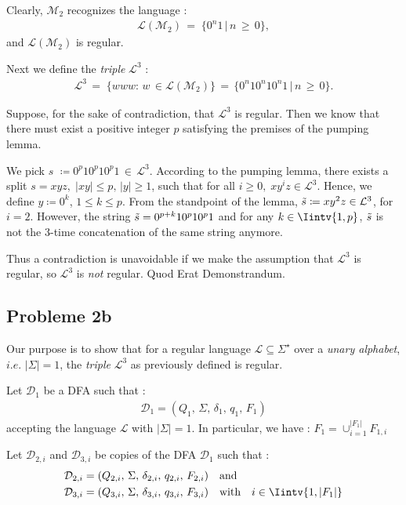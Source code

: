 \documentclass{article}
\begin{document}
Clearly, $\mathcal{M}_2$ recognizes the language :
\begin{align*}
    \mathcal{L}(\mathcal{M}_2)\,=\; \{0^n1\,|\, n\,\geq\, 0\},
\end{align*}
and $\mathcal{L}(\mathcal{M}_2)$ is regular.

Next we define the \textit{triple} $\mathcal{L}^3$ :
\begin{align*}
    \mathcal{L}^3\,=\;\{www :\,w\,\in\mathcal{L}(\mathcal{M}_2)\}\,=\,\{0^n10^n10^n1\,|\, n\,\geq\, 0\}.
\end{align*}

Suppose, for the sake of contradiction, that $\mathcal{L}^3$ is regular. Then we know that there must exist a positive integer $p$ satisfying the premises of the pumping lemma.

We pick $s$ $\coloneqq 0^p10^p10^p1\,\in\, \mathcal{L}^3$. According to the pumping lemma, there exists a split $s=xyz,\; \lvert xy\rvert\leq p,\, \lvert y\rvert\geq1$, such that for all $i\geq0,\; xy^iz\in\mathcal{L}^3$. Hence, we define $y\coloneqq0^k$, $1\leq k\leq p$. From the standpoint of the lemma, $\Tilde{s}\coloneqq xy^2z\in\mathcal{L}^3$, for $i=2$. However, the string $\Tilde{s}=0^{p+k}10^p10^p1$ and for any $k\in\Iintv{1,p}$, $\Tilde{s}$ is not the 3-time concatenation of the same string anymore.

Thus a contradiction is unavoidable if we make the assumption that $\mathcal{L}^3$ is regular, so $\mathcal{L}^3$ is \textit{not} regular. Quod Erat Demonstrandum.

\subsection{Probleme 2b}
Our purpose is to show that for a regular language $\mathcal{L}\subseteq\Sigma^\star$ over a \textit{unary alphabet}, $i.e.$ $\lvert\Sigma\rvert=1$, the \textit{triple} $\mathcal{L}^3$ as previously defined is regular.

Let $\mathcal{D}_1$ be a DFA such that :
\begin{align*}
    \mathcal{D}_1=(Q_1,\, \Sigma,\, \delta_1,\, q_1,\, F_1)
\end{align*} 
accepting the language $\mathcal{L}$ with $\lvert\Sigma\rvert=1$. In particular, we have : $F_1=\cup_{i=1}^{\lvert F_1\rvert}F_{1,i} $

Let $\mathcal{D}_{2,i}$ and $\mathcal{D}_{3,i}$ be copies of the DFA $\mathcal{D}_1$ such that :
\begin{align*}
    \mathcal{D}_{2,i}&=(Q_{2,i},\, \Sigma,\, \delta_{2,i},\, q_{2,i},\, F_{2,i})\quad\text{and}\\
    \mathcal{D}_{3,i}&=(Q_{3,i},\, \Sigma,\, \delta_{3,i},\, q_{3,i},\, F_{3,i})\quad\text{with}\quad i\in\Iintv{1,\lvert F_1\rvert}
\end{align*}
\end{document}
